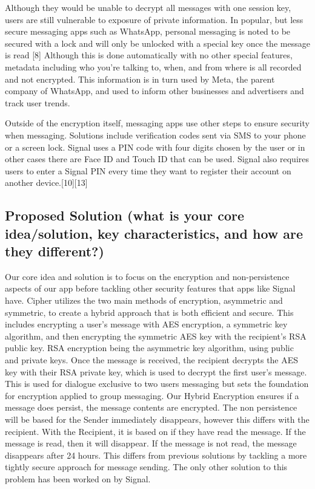 \documentclass[12pt]{article}
\begin{document}
Although they would be unable to decrypt all messages with one session key, users are still vulnerable to exposure of private information. In popular, but less secure messaging apps such as WhatsApp, personal messaging is noted to be secured with a lock and will only be unlocked with a special key once the message is read [8] Although this is done automatically with no other special features, metadata including who you're talking to, when, and from where is all recorded and not encrypted. This information is in turn used by Meta, the parent company of WhatsApp, and used to inform other businesses and advertisers and track user trends. 

Outside of the encryption itself, messaging apps use other steps to ensure security when messaging. Solutions include verification codes sent via SMS to your phone or a screen lock. Signal uses a PIN code with four digits chosen by the user or in other cases there are Face ID and Touch ID that can be used. Signal also requires users to enter a Signal PIN every time they want to register their account on another device.[10][13]

\subsection{Proposed Solution (what is your core idea/solution, key characteristics, and how are they different?)}
Our core idea and solution is to focus on the encryption and non-persistence aspects of our app before tackling other security features that apps like Signal have. Cipher utilizes the two main methods of encryption, asymmetric and symmetric, to create a hybrid approach that is both efficient and secure. This includes encrypting a user’s message with AES encryption, a symmetric key algorithm, and then encrypting the symmetric AES key with the recipient’s RSA public key. RSA encryption being the asymmetric key algorithm, using public and private keys. Once the message is received, the recipient decrypts the AES key with their RSA private key, which is used to decrypt the first user’s message. This is used for dialogue exclusive to two users messaging but sets the foundation for encryption applied to group messaging. Our Hybrid Encryption ensures if a message does persist, the message contents are encrypted. The non persistence will be based for the Sender immediately disappears, however this differs with the recipient. With the Recipient, it is based on if they have read the message. If the message is read, then it will disappear. If the message is not read, the message disappears after 24 hours. This differs from previous solutions by tackling a more tightly secure approach for message sending. The only other solution to this problem has been worked on by Signal.
\end{document}
